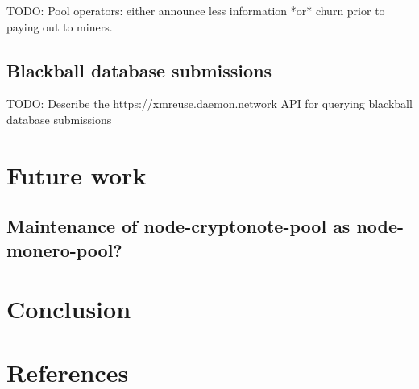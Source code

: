 \documentclass[notitlepage]{report}
\begin{document}
TODO: Pool operators: either announce less information *or* churn prior to paying out to miners.

\subsection{Blackball database submissions}

TODO: Describe the https://xmreuse.daemon.network API for querying blackball database submissions

\section{Future work}

\subsection{Maintenance of node-cryptonote-pool as node-monero-pool?}

\section{Conclusion}

\section{References}
\end{document}
